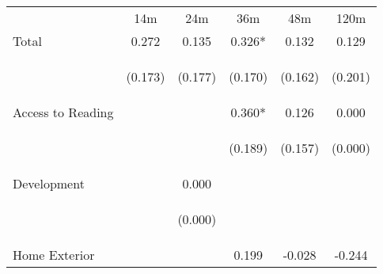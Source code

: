 \begin{tabular}{lccccc}
\hline \noalign{\smallskip} & 14m & 24m & 36m & 48m & 120m\\
\noalign{\smallskip}\hline \noalign{\smallskip}Total & 0.272 & 0.135 & 0.326* & 0.132 & 0.129\\
 & \begin{footnotesize}(0.173)\end{footnotesize} & \begin{footnotesize}(0.177)\end{footnotesize} & \begin{footnotesize}(0.170)\end{footnotesize} & \begin{footnotesize}(0.162)\end{footnotesize} & \begin{footnotesize}(0.201)\end{footnotesize}\\
\noalign{\smallskip}Access to Reading &  &  & 0.360* & 0.126 & 0.000\\
 & \begin{footnotesize}\end{footnotesize} & \begin{footnotesize}\end{footnotesize} & \begin{footnotesize}(0.189)\end{footnotesize} & \begin{footnotesize}(0.157)\end{footnotesize} & \begin{footnotesize}(0.000)\end{footnotesize}\\
\noalign{\smallskip}Development &  & 0.000 &  &  & \\
 & \begin{footnotesize}\end{footnotesize} & \begin{footnotesize}(0.000)\end{footnotesize} & \begin{footnotesize}\end{footnotesize} & \begin{footnotesize}\end{footnotesize} & \begin{footnotesize}\end{footnotesize}\\
\noalign{\smallskip}Home Exterior &  &  & 0.199 & -0.028 & -0.244\\

\end{tabular}
